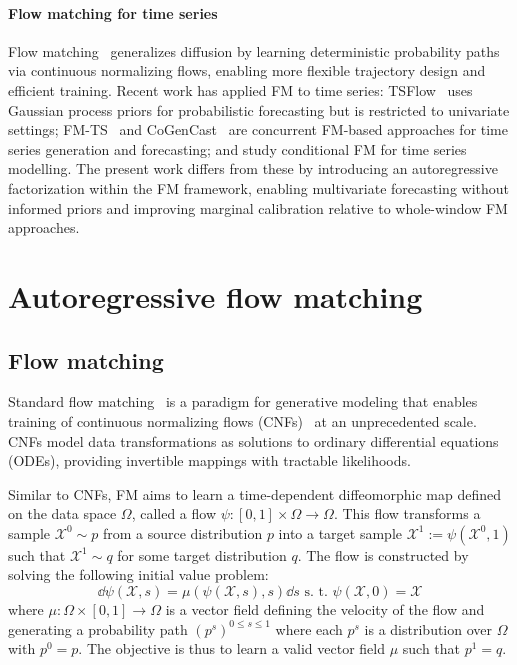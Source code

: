 \documentclass[preprint,12pt,authoryear]{elsarticle}
\begin{document}
{\paragraph{Flow matching for time series}
Flow matching~\citep{Lipman2022,liu2022flow,albergo2023stochastic} generalizes diffusion by learning deterministic probability paths via continuous normalizing flows, enabling more flexible trajectory design and efficient training. Recent work has applied FM to time series: TSFlow~\citep{Kerrigan2024Flow} uses Gaussian process priors for probabilistic forecasting but is restricted to univariate settings; FM-TS~\citep{Hu2024} and CoGenCast~\citep{Liu2026cogenccast} are concurrent FM-based approaches for time series generation and forecasting; and \citet{Tamir2024} study conditional FM for time series modelling. The present work differs from these by introducing an autoregressive factorization within the FM framework, enabling multivariate forecasting without informed priors and improving marginal calibration relative to whole-window FM approaches.
}

\section{Autoregressive flow matching}

\subsection{Flow matching}
Standard flow matching~\citep{Lipman2022} is a paradigm for generative modeling that enables training of continuous normalizing flows (CNFs)~\citep{chen2018neural, grathwohl2018ffjord} at an unprecedented scale. CNFs model data transformations as solutions to ordinary differential equations (ODEs), providing invertible mappings with tractable likelihoods.

Similar to CNFs, FM aims to learn a time-dependent diffeomorphic map defined on the data space $\Omega$, called a flow $\psi \colon [0, 1] \times \Omega \to \Omega$.
This flow transforms a sample $\mathcal{X}^0 \sim p$ from a source distribution $p$ into a target sample $\mathcal{X}^1 := \psi(\mathcal{X}^0, 1)$ such that $\mathcal{X}^1 \sim q$ for some target distribution $q$. The flow is constructed by solving the following initial value problem:
\begin{equation}\label{eq1}
    \dd \psi(\mathcal{X}, s
) = \mu(\psi(\mathcal{X},s
),s) \dd s \text{ s.~t. } \psi(\mathcal{X},0
) = \mathcal{X} %
\end{equation}
where $\mu \colon \Omega \times [0, 1] \to \Omega$ is a vector field defining the velocity of the flow and generating a probability path $(p^s)^{0 \leq s \leq 1}$ where each $p^s$ is a distribution over $\Omega$ with $p^0 = p$. The objective is thus to learn a valid vector field $\mu$ such that $p^1 = q$.
\end{document}
